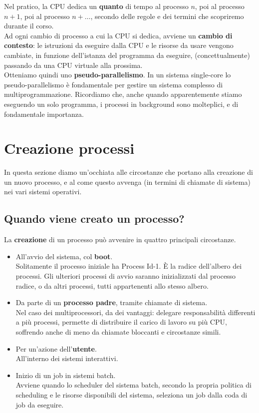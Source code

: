 \documentclass{report}
\begin{document}
Nel pratico, la CPU dedica un \textbf{quanto} di tempo al processo $n$, poi al processo $n+1$, poi al processo $n+\dots$, secondo delle regole e dei termini che scopriremo durante il corso.\\
Ad ogni cambio di processo a cui la CPU si dedica, avviene un \textbf{cambio di contesto}: le istruzioni da eseguire dalla CPU e le risorse da usare vengono cambiate, in funzione dell'istanza del programma da eseguire, (concettualmente) passando da una CPU virtuale alla prossima.\\
Otteniamo quindi uno \textbf{pseudo-parallelismo}.
In un sistema single-core lo pseudo-parallelismo è fondamentale per gestire un sistema complesso di multiprogrammazione. Ricordiamo che, anche quando apparentemente stiamo eseguendo un solo programma, i processi in background sono molteplici, e di fondamentale importanza.


\section{Creazione processi}
In questa sezione diamo un'occhiata alle circostanze che portano alla creazione di un nuovo processo, e al come questo avvenga (in termini di chiamate di sistema) nei vari sistemi operativi.

\subsection{Quando viene creato un processo?}
La \textbf{creazione} di un processo può avvenire in quattro principali circostanze.
\begin{itemize}
    \item All'avvio del sistema, col \textbf{boot}.\\
    Solitamente il processo iniziale ha Process Id-1. È la radice dell'albero dei processi. Gli ulteriori processi di avvio saranno inizializzati dal processo radice, o da altri processi, tutti appartenenti allo stesso albero.

    \item Da parte di un \textbf{processo padre}, tramite chiamate di sistema.\\
    Nel caso dei multiprocessori, da dei vantaggi: delegare responsabilità differenti a più processi, permette di distribuire il carico di lavoro su più CPU, soffrendo anche di meno da chiamate bloccanti e circostanze simili.
    
    \item Per un'azione dell'\textbf{utente}.\\
    All'interno dei sistemi interattivi.

    \item Inizio di un job in sistemi batch.\\
    Avviene quando lo scheduler del sistema batch, secondo la propria politica di scheduling e le risorse disponibili del sistema, seleziona un job dalla coda di job da eseguire. 
\end{itemize}
\end{document}
